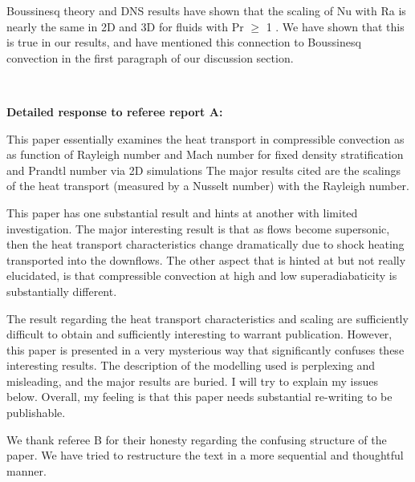 \documentclass[aps, 11pt, singlecolumn]{revtex4-1} %
\begin{document}
\begin{singlespace}
Boussinesq theory and DNS results have shown that the scaling of Nu with Ra
is nearly the same in 2D and 3D for fluids with Pr $\geq$ 1 \cite{ahlers&all2009}.
We have shown that this is true in our results, and have mentioned this connection
to Boussinesq convection in the first paragraph of our discussion section.





$\,$
\newline
$\,$
\newline

\textbf{Detailed response to referee report A:}

\begin{myquotation}
This paper essentially examines the heat transport in compressible
convection as as function of Rayleigh number and Mach number for fixed
density stratification and Prandtl number via 2D simulations The major
results cited are the scalings of the heat transport (measured by a
Nusselt number) with the Rayleigh number.

This paper has one substantial result and hints at another with
limited investigation. The major interesting result is that as flows
become supersonic, then the heat transport characteristics change
dramatically due to shock heating transported into the downflows. The
other aspect that is hinted at but not really elucidated, is that
compressible convection at high and low superadiabaticity is
substantially different.

The result regarding the heat transport characteristics and scaling
are sufficiently difficult to obtain and sufficiently interesting to
warrant publication. However, this paper is presented in a very
mysterious way that significantly confuses these interesting results.
The description of the modelling used is perplexing and misleading,
and the major results are buried. I will try to explain my issues
below. Overall, my feeling is that this paper needs substantial
re-writing to be publishable.
\end{myquotation}
We thank referee B for their honesty regarding the confusing
structure of the paper.  We have tried to restructure the text in
a more sequential and thoughtful manner.


\end{singlespace}
\end{document}
